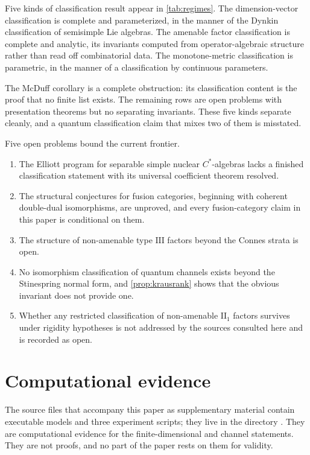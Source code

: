 \documentclass[11pt,letterpaper]{article}
\theoremstyle{definition}
\theoremstyle{remark}
\begin{document}
Five kinds of classification result appear in \cref{tab:regimes}. The dimension-vector classification is complete and parameterized, in the manner of the Dynkin classification of semisimple Lie algebras. The amenable factor classification is complete and analytic, its invariants computed from operator-algebraic structure rather than read off combinatorial data. The monotone-metric classification is parametric, in the manner of a classification by continuous parameters.

The McDuff corollary is a complete obstruction: its classification content is the proof that no finite list exists. The remaining rows are open problems with presentation theorems but no separating invariants. These five kinds separate cleanly, and a quantum classification claim that mixes two of them is misstated.

Five open problems bound the current frontier.
\begin{enumerate}
\item The Elliott program for separable simple nuclear $C^*$-algebras lacks a finished classification statement with its universal coefficient theorem resolved.
\item The structural conjectures for fusion categories, beginning with coherent double-dual isomorphisms, are unproved, and every fusion-category claim in this paper is conditional on them.
\item The structure of non-amenable type $\mathrm{III}$ factors beyond the Connes strata is open.
\item No isomorphism classification of quantum channels exists beyond the Stinespring normal form, and \cref{prop:krausrank} shows that the obvious invariant does not provide one.
\item Whether any restricted classification of non-amenable $\mathrm{II}_1$ factors survives under rigidity hypotheses is not addressed by the sources consulted here and is recorded as open.
\end{enumerate}

\section{Computational evidence}
\label{sec:computation}

The source files that accompany this paper as supplementary material contain executable models and three experiment scripts; they live in the directory . They are computational evidence for the finite-dimensional and channel statements. They are not proofs, and no part of the paper rests on them for validity.
\end{document}
